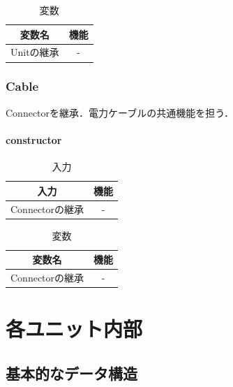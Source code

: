\documentclass[uplatex,dvipdfmx,report]{jlreq}
\begin{document}
\begin{table}[H]
    \centering
    \caption{変数}
    \begin{tabular}{cc}
        \hline
        変数名 & 機能 \\
        \hline
        \hline
        Unitの継承 & - \\
        \hline
    \end{tabular}
\end{table}

\subsection{Cable}

Connectorを継承．電力ケーブルの共通機能を担う．

\subsubsection{constructor}

\begin{table}[H]
    \centering
    \caption{入力}
    \begin{tabular}{cc}
        \hline
        入力 & 機能 \\
        \hline
        \hline
        Connectorの継承 & - \\
        \hline
    \end{tabular}
\end{table}

\begin{table}[H]
    \centering
    \caption{変数}
    \begin{tabular}{cc}
        \hline
        変数名 & 機能 \\
        \hline
        \hline
        Connectorの継承 & - \\
        \hline
    \end{tabular}
\end{table}

\chapter{各ユニット内部}

\section{基本的なデータ構造}
\end{document}

